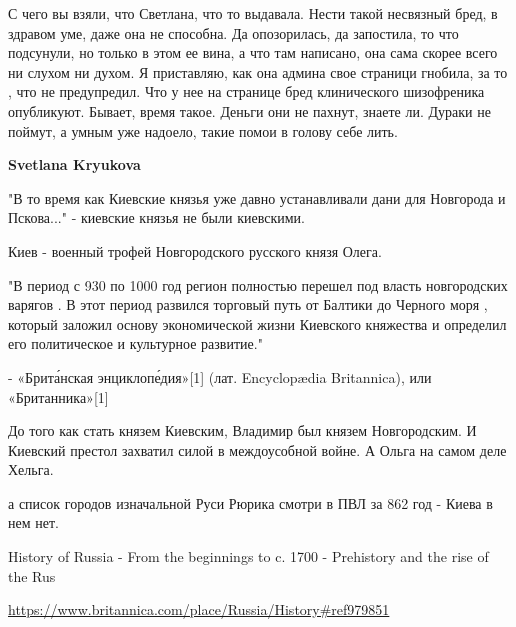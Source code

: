 \begin{itemize}
\begin{itemize}
 

С чего вы взяли, что Светлана, что то выдавала. Нести такой несвязный бред, в
здравом уме, даже она не способна. Да опозорилась, да запостила, то что
подсунули, но только в этом ее вина, а что там написано, она сама скорее всего
ни слухом ни духом. Я приставляю, как она админа свое страници гнобила, за то ,
что не предупредил. Что у нее на странице бред клинического шизофреника
опубликуют. Бывает, время такое. Деньги они не пахнут, знаете ли. Дураки не
поймут, а умным уже надоело, такие помои в голову себе лить.


 
\textbf{Svetlana Kryukova} 

"В то время как Киевские князья уже давно устанавливали дани для Новгорода и
Пскова..." - киевские князья не были киевскими.

Киев - военный трофей Новгородского русского князя Олега.

"В период с 930 по 1000 год регион полностью перешел под власть новгородских
варягов . В этот период развился торговый путь от Балтики до Черного моря ,
который заложил основу экономической жизни Киевского княжества и определил его
политическое и культурное развитие."

- «Брита́нская энциклопе́дия»[1] (лат. Encyclopædia Britannica), или «Британника»[1]

До того как стать князем Киевским, Владимир был князем Новгородским. И Киевский
престол захватил силой в междоусобной войне. А Ольга на самом деле Хельга.

а список городов изначальной Руси Рюрика смотри в ПВЛ за 862 год - Киева в нем нет.

History of Russia - From the beginnings to c. 1700 - Prehistory and the rise of the Rus\par
\url{https://www.britannica.com/place/Russia/History#ref979851}

 

\end{itemize}
\end{itemize}
